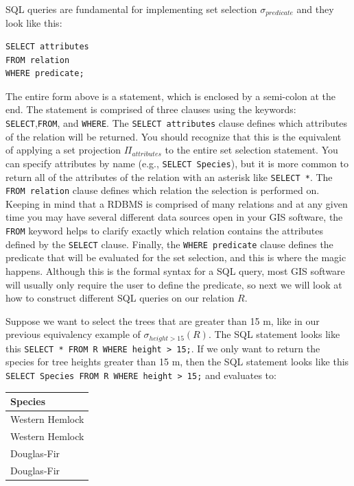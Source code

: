 \documentclass[
]{book}
\begin{document}
SQL queries are fundamental for implementing set selection \(σ_{predicate}\) and they look like this:

\begin{verbatim}
SELECT attributes
FROM relation
WHERE predicate;
\end{verbatim}

The entire form above is a statement, which is enclosed by a semi-colon at the end. The statement is comprised of three clauses using the keywords: \texttt{SELECT},\texttt{FROM}, and \texttt{WHERE}. The \texttt{SELECT\ attributes} clause defines which attributes of the relation will be returned. You should recognize that this is the equivalent of applying a set projection \(Π_{attributes}\) to the entire set selection statement. You can specify attributes by name (e.g., \texttt{SELECT\ Species}), but it is more common to return all of the attributes of the relation with an asterisk like \texttt{SELECT\ *}. The \texttt{FROM\ relation} clause defines which relation the selection is performed on. Keeping in mind that a RDBMS is comprised of many relations and at any given time you may have several different data sources open in your GIS software, the \texttt{FROM} keyword helps to clarify exactly which relation contains the attributes defined by the \texttt{SELECT} clause. Finally, the \texttt{WHERE\ predicate} clause defines the predicate that will be evaluated for the set selection, and this is where the magic happens. Although this is the formal syntax for a SQL query, most GIS software will usually only require the user to define the predicate, so next we will look at how to construct different SQL queries on our relation \(R\).

Suppose we want to select the trees that are greater than 15 m, like in our previous equivalency example of \(σ_{height>15}(R)\). The SQL statement looks like this \texttt{SELECT\ *\ FROM\ R\ WHERE\ height\ \textgreater{}\ 15;}. If we only want to return the species for tree heights greater than 15 m, then the SQL statement looks like this \texttt{SELECT\ Species\ FROM\ R\ WHERE\ height\ \textgreater{}\ 15;} and evaluates to:

\begin{tabular}{l}
\toprule
Species\\
\midrule
Western Hemlock\\
Western Hemlock\\
Douglas-Fir\\
Douglas-Fir\\
\bottomrule
\end{tabular}
\end{document}

